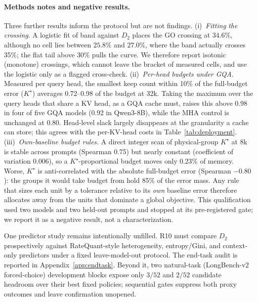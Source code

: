 \paragraph{Methods notes and negative results.}
Three further results inform the protocol but are not findings.
(i)~\emph{Fitting the crossing.}  A logistic fit of band against $D_2$ places the
GO crossing at $34.6\%$, although no cell lies between $25.8\%$ and $27.0\%$,
where the band actually crosses 35\%; the flat tail above 30\% pulls the curve.
We therefore report isotonic (monotone) crossings, which cannot leave the
bracket of measured cells, and use the logistic only as a flagged cross-check.
(ii)~\emph{Per-head budgets under GQA.}  Measured per query head, the smallest
keep count within 10\% of the full-budget error ($K^\star$) averages 0.72--0.98
of the budget at 32k.  Taking the maximum over the query heads that share a KV
head, as a GQA cache must, raises this above 0.98 in four of five GQA models
(0.92 in Qwen3-8B), while the MHA control is unchanged at 0.80.  Head-level slack
largely disappears at the granularity a cache can store; this agrees with the
per-KV-head costs in Table~\ref{tab:deployment}.
(iii)~\emph{Own-baseline budget rules.}  A direct integer scan of physical-group
$K^\star$ at 8k is stable across prompts (Spearman 0.75) but nearly constant
(coefficient of variation 0.006), so a $K^\star$-proportional budget moves only
0.23\% of memory.  Worse, $K^\star$ is anti-correlated with the absolute
full-budget error (Spearman $-0.80$): the groups it would take budget from hold
85\% of the error mass.  Any rule that sizes each unit by a tolerance relative
to its \emph{own} baseline error therefore allocates away from the units that
dominate a global objective.  This qualification used two models and two
held-out prompts and stopped at its pre-registered gate; we report it as a
negative result, not a characterization.

One predictor study remains intentionally unfilled.  R10 must compare $D_2$
prospectively against RateQuant-style heterogeneity, entropy/Gini, and
context-only predictors under a fixed leave-model-out protocol.  The end-task
audit is reported in Appendix~\ref{app:endtask}.  Beyond it, two natural-task
(LongBench-v2~\citep{bai2025longbenchv2} forced-choice) development blocks expose only $3/52$ and $2/52$
candidate headroom over their best fixed policies; sequential gates suppress
both proxy outcomes and leave confirmation unopened.


